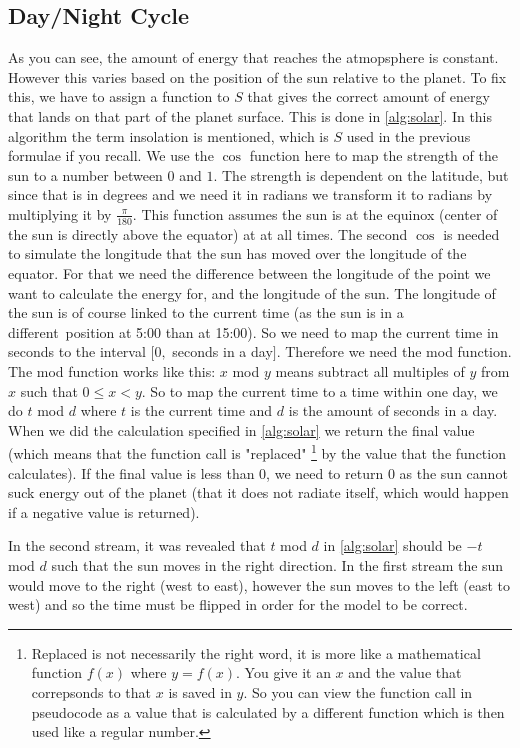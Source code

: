 \subsection{Day/Night Cycle}
As you can see, the amount of energy that reaches the atmopsphere is constant. However this varies based on the position of the sun relative to the planet. To fix this, we have to assign a function 
to $S$ that gives the correct amount of energy that lands on that part of the planet surface. This is done in \autoref{alg:solar}. In this algorithm the term insolation is mentioned, which is $S$
used in the previous formulae if you recall. We use the $\cos$ function here to map the strength of the sun to a number between $0$ and $1$. The strength is dependent on the latitude, but since 
that is in degrees and we need it in radians we transform it to radians by multiplying it by $\frac{\pi}{180}$. This function assumes the sun is at the equinox (center of the sun is directly 
above the equator) \cite{equinox} at at all times. The second $\cos$ is needed to simulate the longitude that the sun has moved over the longitude of the equator. For that we need the difference 
between the longitude of the point we want to calculate the energy for, and the longitude of the sun. The longitude of the sun is of course linked to the current time (as the sun is in a different\
position at 5:00 than at 15:00). So we need to map the current time in seconds to the interval $[0,$ seconds in a day$]$. Therefore we need the mod function. The mod function works like this:
$x$ mod $y$ means subtract all multiples of $y$ from $x$ such that $0 \leq x < y$. So to map the current time to a time within one day, we do $t$ mod $d$ where $t$ is the current time and $d$ is 
the amount of seconds in a day. When we did the calculation specified in \autoref{alg:solar} we return the final value (which means that the function call is "replaced" \footnote{Replaced is not 
necessarily the right word, it is more like a mathematical function $f(x)$ where $y = f(x)$. You give it an $x$ and the value that correpsonds to that $x$ is saved in $y$. So you can view the 
function call in pseudocode as a value that is calculated by a different function which is then used like a regular number.} by the value that the function calculates). If the final value is less 
than 0, we need to return 0 as the sun cannot suck energy out of the planet (that it does not radiate itself, which would happen if a negative value is returned).

In the second stream, it was revealed that $t$ mod $d$ in \autoref{alg:solar} should be $-t$ mod $d$ such that the sun moves in the right direction. In the first stream the sun would move to the 
right (west to east), however the sun moves to the left (east to west) and so the time must be flipped in order for the model to be correct.

